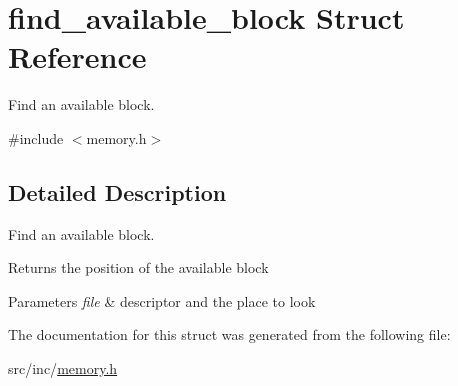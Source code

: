 \hypertarget{structfind__available__block}{}\section{find\+\_\+available\+\_\+block Struct Reference}
\label{structfind__available__block}


Find an available block.  




{\ttfamily \#include $<$memory.\+h$>$}



\subsection{Detailed Description}
Find an available block. 

\begin{DoxyReturn}{Returns}
the position of the available block 
\end{DoxyReturn}

\begin{DoxyParams}{Parameters}
{\em file} & descriptor and the place to look \\
\hline
\end{DoxyParams}


The documentation for this struct was generated from the following file\+:\begin{DoxyCompactItemize}
\item 
src/inc/\mbox{\hyperlink{memory_8h}{memory.\+h}}\end{DoxyCompactItemize}
